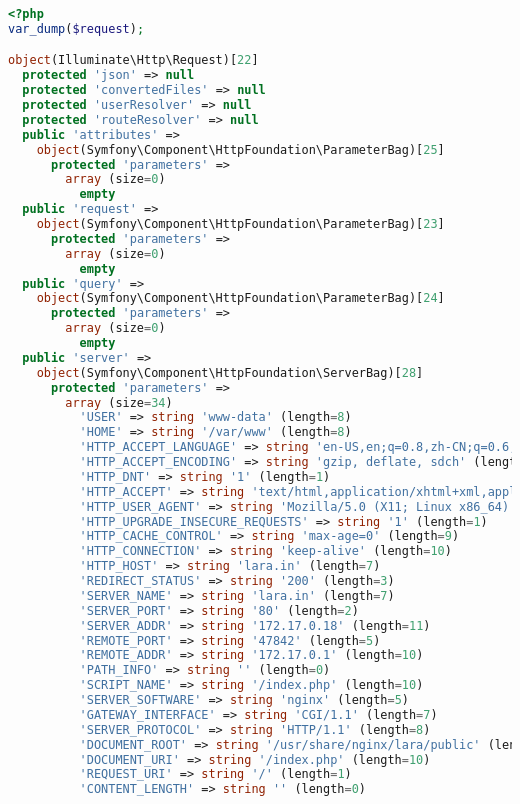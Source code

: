 \begin{lstlisting}[language=PHP]
<?php
var_dump($request);

object(Illuminate\Http\Request)[22]
  protected 'json' => null
  protected 'convertedFiles' => null
  protected 'userResolver' => null
  protected 'routeResolver' => null
  public 'attributes' => 
    object(Symfony\Component\HttpFoundation\ParameterBag)[25]
      protected 'parameters' => 
        array (size=0)
          empty
  public 'request' => 
    object(Symfony\Component\HttpFoundation\ParameterBag)[23]
      protected 'parameters' => 
        array (size=0)
          empty
  public 'query' => 
    object(Symfony\Component\HttpFoundation\ParameterBag)[24]
      protected 'parameters' => 
        array (size=0)
          empty
  public 'server' => 
    object(Symfony\Component\HttpFoundation\ServerBag)[28]
      protected 'parameters' => 
        array (size=34)
          'USER' => string 'www-data' (length=8)
          'HOME' => string '/var/www' (length=8)
          'HTTP_ACCEPT_LANGUAGE' => string 'en-US,en;q=0.8,zh-CN;q=0.6,zh;q=0.4,zh-TW;q=0.2' (length=47)
          'HTTP_ACCEPT_ENCODING' => string 'gzip, deflate, sdch' (length=19)
          'HTTP_DNT' => string '1' (length=1)
          'HTTP_ACCEPT' => string 'text/html,application/xhtml+xml,application/xml;q=0.9,image/webp,*/*;q=0.8' (length=74)
          'HTTP_USER_AGENT' => string 'Mozilla/5.0 (X11; Linux x86_64) AppleWebKit/537.36 (KHTML, like Gecko) Chrome/52.0.2743.82 Safari/537.36' (length=104)
          'HTTP_UPGRADE_INSECURE_REQUESTS' => string '1' (length=1)
          'HTTP_CACHE_CONTROL' => string 'max-age=0' (length=9)
          'HTTP_CONNECTION' => string 'keep-alive' (length=10)
          'HTTP_HOST' => string 'lara.in' (length=7)
          'REDIRECT_STATUS' => string '200' (length=3)
          'SERVER_NAME' => string 'lara.in' (length=7)
          'SERVER_PORT' => string '80' (length=2)
          'SERVER_ADDR' => string '172.17.0.18' (length=11)
          'REMOTE_PORT' => string '47842' (length=5)
          'REMOTE_ADDR' => string '172.17.0.1' (length=10)
          'PATH_INFO' => string '' (length=0)
          'SCRIPT_NAME' => string '/index.php' (length=10)
          'SERVER_SOFTWARE' => string 'nginx' (length=5)
          'GATEWAY_INTERFACE' => string 'CGI/1.1' (length=7)
          'SERVER_PROTOCOL' => string 'HTTP/1.1' (length=8)
          'DOCUMENT_ROOT' => string '/usr/share/nginx/lara/public' (length=28)
          'DOCUMENT_URI' => string '/index.php' (length=10)
          'REQUEST_URI' => string '/' (length=1)
          'CONTENT_LENGTH' => string '' (length=0)

\end{lstlisting}
